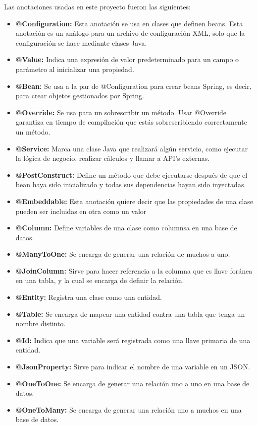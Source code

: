 Las anotaciones usadas en este proyecto fueron las siguientes:
\begin{itemize}
	\item  \textbf{@Configuration:} Esta anotación se usa en clases que definen beans. Esta anotación es un análogo para un archivo de configuración XML, solo que la configuración se hace mediante clases Java.
	\item \textbf{@Value:} Indica una expresión de valor predeterminado para un campo o parámetro al inicializar una propiedad.
	\item \textbf{@Bean:} Se usa a la par de @Configuration para crear beans Spring, es decir, para crear objetos gestionados por Spring. 
	\item \textbf{@Override:} Se usa para un sobrescribir un método. Usar @Override garantiza en tiempo de compilación que estás sobrescribiendo correctamente un método.
	\item \textbf{@Service:} Marca una clase Java que realizará algún servicio, como ejecutar la lógica de negocio, realizar cálculos y llamar a API's externas.
	\item \textbf{@PostConstruct:} Define un método que debe ejecutarse después de que el bean haya sido inicializado y todas sus dependencias hayan sido inyectadas.
	\item \textbf{@Embeddable:} Esta anotación quiere decir que las propiedades de una clase pueden ser incluidas en otra como un valor
	\item \textbf{@Column:} Define variables de una clase como columnsa en una base de datos.
	\item \textbf{@ManyToOne:} Se encarga de generar una relación de muchos a uno. 
	\item \textbf{@JoinColumn:} Sirve para hacer referencia a la columna que es llave foránea en una tabla, y la cual se encarga de definir la relación.
	\item \textbf{@Entity:} Registra una clase como una entidad.
	\item \textbf{@Table:} Se encarga de mapear una entidad contra una tabla que tenga un nombre distinto. 
	\item \textbf{@Id:} Indica que una variable será registrada como una llave primaria de una entidad.
	\item \textbf{@JsonProperty:} Sirve para indicar el nombre de una variable en un JSON.
	\item \textbf{@OneToOne:} Se encarga de generar una relación uno a uno en una base de datos.
	\item \textbf{@OneToMany:} Se encarga de generar una relación uno a muchos en una base de datos.

\end{itemize}
